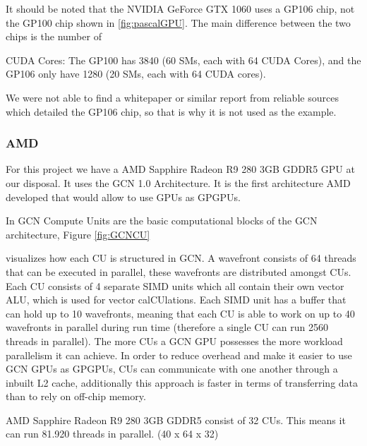 It should be noted that the NVIDIA GeForce GTX 1060 uses a GP106 chip, not the GP100 chip shown in \ref{fig:pascalGPU}. 
The main difference between the two chips is the number of {CUDA Cores: The GP100 has 3840 (60 \glspl{SM}, each with 64 CUDA Cores), and the GP106 only have 1280 (20 \glspl{SM}, each with 64 CUDA cores).

We were not able to find a whitepaper or similar report from reliable sources which detailed the GP106 chip, so that is why it is not used as the example. 


\subsubsection{AMD}
For this project we have a AMD Sapphire Radeon R9 280 3GB GDDR5 \gls{GPU} at our disposal. It uses the \gls{GCN} 1.0 Architecture.
It is the first architecture AMD developed that would allow to use \glspl{GPU} as \glspl{GPGPU}.


In \gls{GCN} Compute Units are the basic computational blocks of the \gls{GCN} architecture, Figure \ref{fig:GCNCU}} visualizes how each \gls{CU} is structured in \gls{GCN}.
A wavefront consists of 64 threads that can be executed in parallel, these wavefronts are distributed amongst \gls{CU}s. 
Each \gls{CU} consists of 4 separate SIMD units which all contain their own vector ALU, which is used for vector cal\gls{CU}lations.  
Each SIMD unit has a buffer that can hold up to 10 wavefronts, meaning that each \gls{CU} is able to work on up to 40 wavefronts in parallel during run time (therefore a single CU can run 2560 threads in parallel). 
The more \glspl{CU} a \gls{GCN} \gls{GPU} possesses the more workload parallelism it can achieve.
In order to reduce overhead and make it easier to use \gls{GCN} \glspl{GPU} as \glspl{GPGPU}, \glspl{CU} can communicate with one another through a inbuilt L2 cache, additionally this approach is faster in terms of transferring data than to rely on off-chip memory.

AMD Sapphire Radeon R9 280 3GB GDDR5 consist of 32 \glspl{CU}.
This means it can run 81.920 threads in parallel. (40 x 64 x 32)

